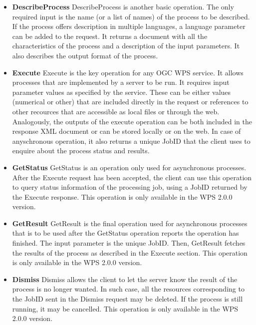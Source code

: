 \begin{itemize}
\begin{itemize}
\item \textbf{DescribeProcess}
DescribeProcess is another basic operation. The only required input is the name (or a list of names) of the process to be described. If the process offers description in multiple languages, a language parameter can be added to the request. It returns a document with all the characteristics of the process and a description of the input parameters. It also describes the output format of the process.

\item \textbf{Execute}
Execute is the key operation for any OGC WPS service. It allows processes that are implemented by a server to be run. It requires input parameter values as specified by the service. These can be either values (numerical or other) that are included directly in the request or references to other recources that are accessible as local files or through the web. Analogously, the outputs of the execute operation can be both included in the response XML document or can be stored locally or on the web. In case of anyschronous operation, it also returns a unique JobID that the client uses to enquire about the process status and results.

\item \textbf{GetStatus}
GetStatus is an operation only used for asynchronous processes. After the Execute request has been accepted, the client can use this operation to query status information of the processing job, using a JobID returned by the Execute response. This operation is only available in the WPS 2.0.0 version.

\item \textbf{GetResult}
GetResult is the final operation used for asynchronous processes that is to be used after the GetStatus operation reports the operation has finished. The input parameter is the unique JobID. Then, GetResult fetches the results of the process as described in the Execute section. This operation is only available in the WPS 2.0.0 version.

\item \textbf{Dismiss}
Dismiss allows the client to let the server know the result of the process is no longer wanted. In such case, all the resources corresponding to the JobID sent in the Dismiss request may be deleted. If the process is still running, it may be cancelled. This operation is only available in the WPS 2.0.0 version.


\end{itemize}
\end{itemize}


